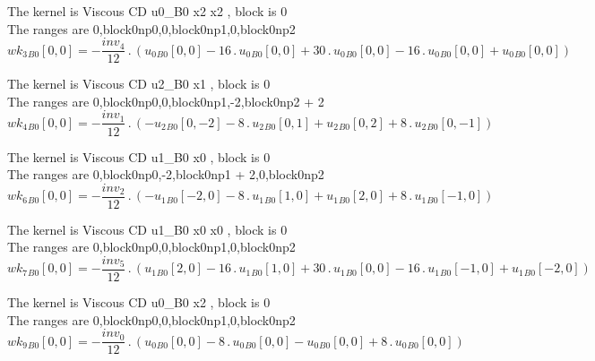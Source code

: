 \documentclass{article}
\begin{document}
\noindent The kernel is Viscous CD u0_B0 x2 x2 , block is 0\\\noindent The ranges are 0,block0np0,0,block0np1,0,block0np2\\\begin{dmath}{wk_{3}{_{B0}}}[{0,0}] = - \frac{inv_4}{12} \,.\, \left({u_{0}{_{B0}}}[{0,0}] - 16 \,.\, {u_{0}{_{B0}}}[{0,0}] + 30 \,.\, {u_{0}{_{B0}}}[{0,0}] - 16 \,.\, {u_{0}{_{B0}}}[{0,0}] + {u_{0}{_{B0}}}[{0,0}]\right)\end{dmath}

\noindent The kernel is Viscous CD u2_B0 x1 , block is 0\\\noindent The ranges are 0,block0np0,0,block0np1,-2,block0np2 + 2\\\begin{dmath}{wk_{4}{_{B0}}}[{0,0}] = - \frac{inv_1}{12} \,.\, \left(- {u_{2}{_{B0}}}[{0,-2}] - 8 \,.\, {u_{2}{_{B0}}}[{0,1}] + {u_{2}{_{B0}}}[{0,2}] + 8 \,.\, {u_{2}{_{B0}}}[{0,-1}]\right)\end{dmath}

\noindent The kernel is Viscous CD u1_B0 x0 , block is 0\\\noindent The ranges are 0,block0np0,-2,block0np1 + 2,0,block0np2\\\begin{dmath}{wk_{6}{_{B0}}}[{0,0}] = - \frac{inv_2}{12} \,.\, \left(- {u_{1}{_{B0}}}[{-2,0}] - 8 \,.\, {u_{1}{_{B0}}}[{1,0}] + {u_{1}{_{B0}}}[{2,0}] + 8 \,.\, {u_{1}{_{B0}}}[{-1,0}]\right)\end{dmath}

\noindent The kernel is Viscous CD u1_B0 x0 x0 , block is 0\\\noindent The ranges are 0,block0np0,0,block0np1,0,block0np2\\\begin{dmath}{wk_{7}{_{B0}}}[{0,0}] = - \frac{inv_5}{12} \,.\, \left({u_{1}{_{B0}}}[{2,0}] - 16 \,.\, {u_{1}{_{B0}}}[{1,0}] + 30 \,.\, {u_{1}{_{B0}}}[{0,0}] - 16 \,.\, {u_{1}{_{B0}}}[{-1,0}] + {u_{1}{_{B0}}}[{-2,0}]\right)\end{dmath}

\noindent The kernel is Viscous CD u0_B0 x2 , block is 0\\\noindent The ranges are 0,block0np0,0,block0np1,0,block0np2\\\begin{dmath}{wk_{9}{_{B0}}}[{0,0}] = - \frac{inv_0}{12} \,.\, \left({u_{0}{_{B0}}}[{0,0}] - 8 \,.\, {u_{0}{_{B0}}}[{0,0}] - {u_{0}{_{B0}}}[{0,0}] + 8 \,.\, {u_{0}{_{B0}}}[{0,0}]\right)\end{dmath}
\end{document}
